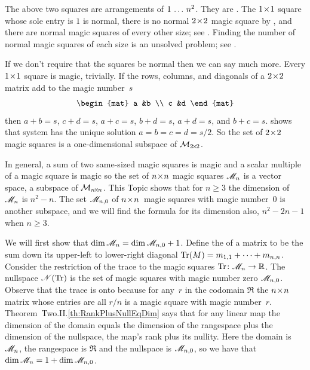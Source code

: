 The above two squares are arrangements of $1\,\ldots\, n^2$.
They are .
The $1 \! \times \! 1$ square whose sole entry is $1$ is normal, there is
no normal $2 \! \times \! 2$ magic square by ,
and there are normal magic squares of every other size; 
see \cite{WikipediaMagicSquare}.
Finding the number of normal magic squares of each size is an unsolved
problem;
see \cite{OnlineEncyclopedia}.
 
If we don't require that the squares be normal then we can say much more.
Every $1 \! \times \! 1$ square is magic, trivially.
If the rows, columns, and diagonals of a $2 \! \times \! 2$ matrix add to 
the magic number~$s$
\begin{equation*}
  \begin{mat}
    a  &b  \\
    c  &d
  \end{mat}
\end{equation*}
then $a+b=s$, $c+d=s$, $a+c=s$, $b+d=s$, $a+d=s$, and $b+c=s$.
 shows that
system has the unique solution $a=b=c=d=s/2$.
So the set of $2 \! \times \! 2$ magic squares
is a one-dimensional subspace of $\mathcal{M}_{2 \! \times \! 2}$.

In general, a sum of two same-sized magic squares is magic and a 
scalar multiple of a magic square is magic so the set of 
$n \! \times \! n$ magic squares
$\mathscr{M}_n$ is a vector space, a subspace of $\mathcal{M}_{n \! \times \! n}$.
This Topic shows that for $n\geq 3$ the 
dimension of
$\mathscr{M}_n$ is $n^2-n$.
The set $\mathscr{M}_{n,0}$ of $n \! \times \! n$~magic squares with magic number~$0$ 
is another subspace, and we will find the formula for its dimension also,
$n^2-2n-1$ when $n\geq 3$.

We will first show that $\dim\mathscr{M}_n=\dim\mathscr{M}_{n,0}+1$.
Define the 
 of a matrix to be
the sum down its upper-left to lower-right diagonal
$\operatorname{Tr} (M)=m_{1,1}+\cdots+m_{n,n}$.
Consider the restriction of the trace to the magic squares
$\mbox{$\operatorname{Tr}\colon \mathscr{M}_n\to \mathbb{R}$}$. 
The nullspace $\mathscr{N}(\operatorname{Tr})$ is the set of magic squares with magic
number zero 
$\mathscr{M}_{n,0}$.
Observe that the trace is onto because for any~$r$ in the 
codomain $\Re$ the $n \! \times \! n$ matrix whose entries are all $r/n$ is
a magic square with magic number~$r$.
Theorem~Two.II.\ref{th:RankPlusNullEqDim} says that for any linear map the
dimension of the domain equals the dimension of the rangespace 
plus the dimension of the nullspace,
the map's rank plus its nullity.
Here the domain is $\mathscr{M}_n$, the rangespace is 
$\Re$ and the nullspace is $\mathscr{M}_{n,0}$,
so we have that $\dim\mathscr{M}_n=1+\dim\mathscr{M}_{n,0}$.

